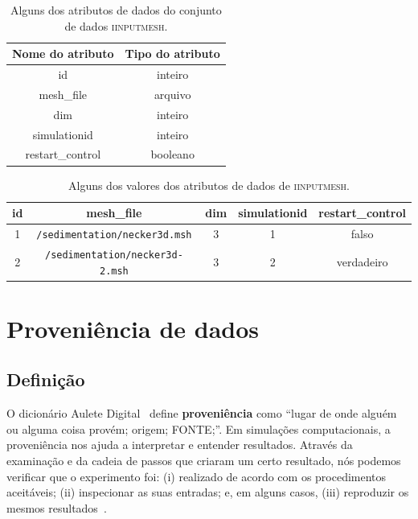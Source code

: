 \begin{table}[ht]
    \centering
    \begin{tabular}{|c|c|}
        \hline
        \textbf{Nome do atributo} & \textbf{Tipo do atributo} \\
        \hline
        id & inteiro \\
        mesh{\_}file & arquivo \\
        dim & inteiro \\
        simulationid & inteiro \\
        restart{\_}control & booleano \\
        \hline
    \end{tabular}
    \caption[Atributos de dados do conjunto de dados \textsc{iinputmesh}]{Alguns dos atributos de dados do conjunto de dados \textsc{iinputmesh}.}%
    \label{tab:iinputmesh-attributes}
\end{table}

\begin{table}[ht]
    \centering
    \begin{tabular}{c|c|c|c|c}
        \textbf{id} & \textbf{mesh{\_}file} & \textbf{dim} & \textbf{simulationid} & \textbf{restart{\_}control} \\
        \hline
        1 & \texttt{/sedimentation/necker3d.msh} & 3 & 1 & \textrm{falso} \\
        2 & \texttt{/sedimentation/necker3d-2.msh} & 3 & 2 & \textrm{verdadeiro} \\
    \end{tabular}
    \caption[Valores dos atributos de dados de \textsc{iinputmesh}]{Alguns dos valores dos atributos de dados de \textsc{iinputmesh}.}%
    \label{tab:iinputmesh-values}
\end{table}

\section{Proveniência de dados}

\subsection{Definição}

O dicionário Aulete Digital~\cite{aulete2014dicionario} define \textbf{proveniência} como
``lugar de onde alguém ou alguma coisa provém; origem; FONTE;''. Em simulações computacionais, a proveniência nos ajuda a interpretar e entender resultados. Através da examinação e da cadeia de passos que criaram um certo resultado, nós podemos verificar que o experimento foi: (i) realizado de acordo com os procedimentos aceitáveis; (ii) inspecionar as suas entradas; e, em alguns casos, (iii) reproduzir os mesmos resultados~\cite{freire2008provenance}.

